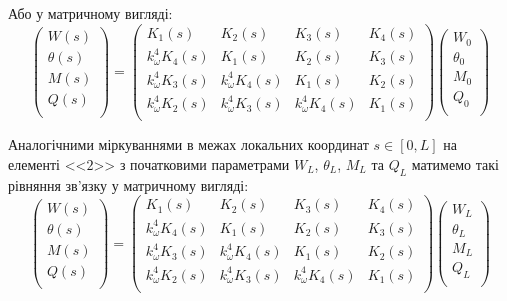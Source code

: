 \documentclass{mathreport}
\begin{document}
Або у матричному вигляді:
\begin{equation}\label{eq: matrix field equations for element 1}
    \begin{pmatrix}
        W(s)      \\
        \theta(s) \\
        M(s)      \\
        Q(s)      \\
    \end{pmatrix} =
    \begin{pmatrix}
        K_1(s)          & K_2(s)          & K_3(s)          & K_4(s) \\
        k_{\omega}^4 K_4(s) & K_1(s)          & K_2(s)          & K_3(s) \\
        k_{\omega}^4 K_3(s) & k_{\omega}^4 K_4(s) & K_1(s)          & K_2(s) \\
        k_{\omega}^4 K_2(s) & k_{\omega}^4 K_3(s) & k_{\omega}^4 K_4(s) & K_1(s) \\
    \end{pmatrix}
    \begin{pmatrix}
        W_0      \\
        \theta_0 \\
        M_0      \\
        Q_0      \\
    \end{pmatrix}
\end{equation} 

Аналогічними міркуваннями в межах локальних координат $s \in [0,L]$ на елементі <<$2$>> з початковими параметрами $W_L$, $\theta_L$, $M_L$ та $Q_L$ матимемо такі рівняння зв'язку у матричному вигляді:
\begin{equation}\label{eq: matrix field equations for element 2}
    \begin{pmatrix}
        W(s)      \\
        \theta(s) \\
        M(s)      \\
        Q(s)      \\
    \end{pmatrix} =
    \begin{pmatrix}
        K_1(s)          & K_2(s)          & K_3(s)          & K_4(s) \\
        k_{\omega}^4 K_4(s) & K_1(s)          & K_2(s)          & K_3(s) \\
        k_{\omega}^4 K_3(s) & k_{\omega}^4 K_4(s) & K_1(s)          & K_2(s) \\
        k_{\omega}^4 K_2(s) & k_{\omega}^4 K_3(s) & k_{\omega}^4 K_4(s) & K_1(s) \\
    \end{pmatrix}
    \begin{pmatrix}
        W_L      \\
        \theta_L \\
        M_L      \\
        Q_L      \\
    \end{pmatrix}
\end{equation} 
\end{document}

